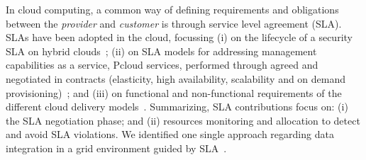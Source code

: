 \documentclass[11pt,a4paper,oneside]{report}
\begin{document}
In cloud computing, a common way of defining requirements and obligations between the \textit{ provider} and \textit{ customer} is through service level agreement (SLA). 
SLAs have been  adopted in the cloud, focussing   (i) on the lifecycle of a security SLA on hybrid clouds~\cite{011}; (ii) on SLA models for addressing  management capabilities  as a service, Pcloud services, performed through agreed and negotiated in contracts (elasticity, high availability, scalability and on demand provisioning)~\cite{009}; and (iii) on functional and non-functional requirements of the different cloud delivery models~\cite{005}.
%
%
Summarizing, SLA contributions focus on: (i)   the SLA negotiation phase; and (ii)  resources monitoring and allocation  to detect and avoid SLA violations. We identified one single approach regarding data integration in a grid environment guided by SLA~\cite{Nie07}.
%
%
%
\end{document}
